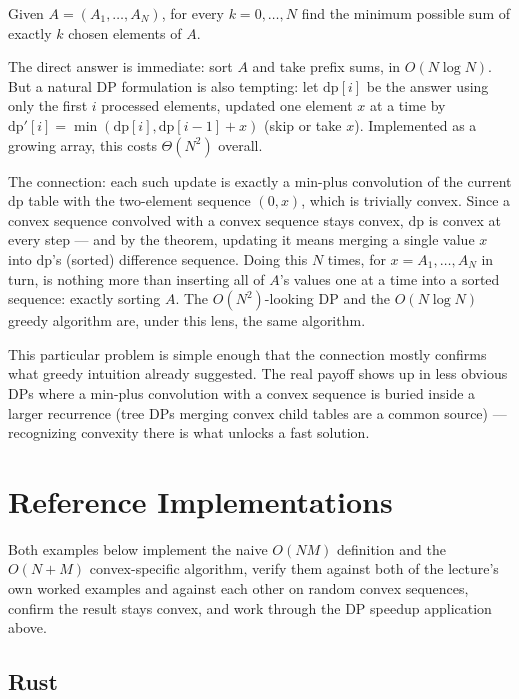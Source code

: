 \documentclass[11pt]{article}
\begin{document}
\begin{definitionbox}
Given $A=(A_1,\ldots,A_N)$, for every $k=0,\ldots,N$ find the minimum
possible sum of exactly $k$ chosen elements of $A$.
\end{definitionbox}

The direct answer is immediate: sort $A$ and take prefix sums, in
$O(N\log N)$. But a natural DP formulation is also tempting: let
$\mathrm{dp}[i]$ be the answer using only the first $i$ processed
elements, updated one element $x$ at a time by
$\mathrm{dp}'[i]=\min(\mathrm{dp}[i], \mathrm{dp}[i-1]+x)$ (skip or take
$x$). Implemented as a growing array, this costs $\Theta(N^2)$ overall.

The connection: each such update is exactly a min-plus convolution of the
current $\mathrm{dp}$ table with the two-element sequence $(0, x)$, which
is trivially convex. Since a convex sequence convolved with a convex
sequence stays convex, $\mathrm{dp}$ is convex at every step --- and by
the theorem, updating it means merging a single value $x$ into
$\mathrm{dp}$'s (sorted) difference sequence. Doing this $N$ times, for
$x = A_1,\ldots,A_N$ in turn, is nothing more than inserting all of $A$'s
values one at a time into a sorted sequence: exactly sorting $A$. The
$O(N^2)$-looking DP and the $O(N\log N)$ greedy algorithm are, under this
lens, the same algorithm.

\begin{notebox}
This particular problem is simple enough that the connection mostly
confirms what greedy intuition already suggested. The real payoff shows
up in less obvious DPs where a min-plus convolution with a convex
sequence is buried inside a larger recurrence (tree DPs merging convex
child tables are a common source) --- recognizing convexity there is what
unlocks a fast solution.
\end{notebox}

\section{Reference Implementations}
Both examples below implement the naive $O(NM)$ definition and the
$O(N+M)$ convex-specific algorithm, verify them against both of the
lecture's own worked examples and against each other on random convex
sequences, confirm the result stays convex, and work through the DP
speedup application above.

\codenote
\subsection{Rust}
\end{document}
